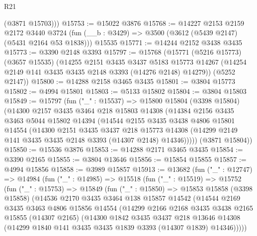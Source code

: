 \begin{lexlean}{R21}
\begin{coremodule}
        (@3871 @15703)))
@15753 := @15022 @3876
@15768 := @14227
    @2153
    @2159
    @2172
    @3440
    @3724
    (fun (__b : @3429) => @3500 (@3612 (@5439 @2147) (@5431 @2164 @53 @1838)))
    @15535
@15771 := @14244 @2152 @3438 @3435
@15773 := @3390 @2148 @3393
@15797 := @15768
    (@15771
      (@5216 @15773)
      (@3657 @15535)
      (@14255
        @2151
        @3435
        @3437
        @5183
        @15773
        @14267
        (@14254 @2149 @141 @3435 @3435 @2148 @3393 (@14276 @2148) @14279))
      (@5252 @2147))
@15800 := @14288 @2158 @3465 @3435
@15801 := @3804 @15773
@15802 := @4994 @15801
@15803 := @5133 @15802
@15804 := @3804 @15803
@15849 := @15797
    (fun ("_" : @15537) =>
    @15800
      @15804
      (@3398 @15804)
      (@14300
        @2157
        @3435
        @3464
        @218
        @15803
        @14308
        (@14384
          @2156
          @3435
          @3463
          @5044
          @15802
          @14394
          (@14544
            @2155
            @3435
            @3438
            @4806
            @15801
            @14554
            (@14300
              @2151
              @3435
              @3437
              @218
              @15773
              @14308
              (@14299 @2149 @141 @3435 @3435 @2148 @3393 (@14307 @2148) @14346)))))
      (@3871 @15804))
@15850 := @15536 @3876
@15853 := @14288 @2171 @3465 @3435
@15854 := @3390 @2165
@15855 := @3804 @13646
@15856 := @15854 @15855
@15857 := @4994 @15856
@15858 := @3989 @15857
@15913 := @13682
    (fun ("_" : @12747) =>
    @14984
      (fun ("_" : @14985) =>
      @15518
        (fun ("_" : @15519) =>
        @15752
          (fun ("_" : @15753) =>
          @15849
            (fun ("_" : @15850) =>
            @15853
              @15858
              (@3398 @15858)
              (@14536
                @2170
                @3435
                @3464
                @138
                @15857
                @14542
                (@14544
                  @2169
                  @3435
                  @3463
                  @4806
                  @15856
                  @14554
                  (@14299
                    @2166
                    @2168
                    @3435
                    @3438
                    @2165
                    @15855
                    (@14307 @2165)
                    (@14300
                      @1842
                      @3435
                      @3437
                      @218
                      @13646
                      @14308
                      (@14299 @1840 @141 @3435 @3435 @1839 @3393 (@14307 @1839) @14346)))))

\end{coremodule}
\end{lexlean}
